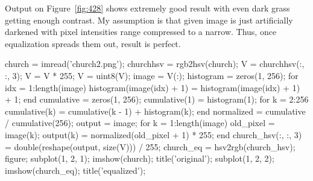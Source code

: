 Output on Figure~\ref{fig:428} shows extremely good result with even dark grass getting enough contrast. My assumption is that given image is just artificially darkened with pixel intensities range compressed to a narrow. Thus, once equalization spreads them out, result is perfect.

\codeused
\begin{matlab}
church = imread('church2.png');
churchhsv = rgb2hsv(church);
V = churchhsv(:, :, 3);
V = V * 255;
V = uint8(V);
image = V(:);
histogram = zeros(1, 256);
for idx = 1:length(image)
    histogram(image(idx) + 1) = histogram(image(idx) + 1) + 1;
end
cumulative = zeros(1, 256);
cumulative(1) = histogram(1);
for k = 2:256
    cumulative(k) = cumulative(k - 1) + histogram(k);
end
normalized = cumulative / cumulative(256);
output = image;
for k = 1:length(image)
    old_pixel = image(k);
    output(k) = normalized(old_pixel + 1) * 255;
end
church_hsv(:, :, 3) = double(reshape(output, size(V))) / 255;
church_eq = hsv2rgb(church_hsv);
figure; subplot(1, 2, 1); imshow(church); title('original');
subplot(1, 2, 2); imshow(church_eq); title('equalized');
\end{matlab}